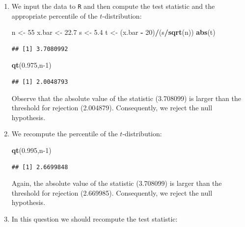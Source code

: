 \documentclass[]{krantz}
\makeatletter
\newenvironment{Shaded}{\begin{snugshade}}{\end{snugshade}}
\newcommand{\DecValTok}[1]{\textcolor[rgb]{0.00,0.00,0.81}{#1}}
\newcommand{\FloatTok}[1]{\textcolor[rgb]{0.00,0.00,0.81}{#1}}
\newcommand{\KeywordTok}[1]{\textcolor[rgb]{0.13,0.29,0.53}{\textbf{#1}}}
\newcommand{\NormalTok}[1]{#1}
\newcommand{\OperatorTok}[1]{\textcolor[rgb]{0.81,0.36,0.00}{\textbf{#1}}}
\newcommand{\StringTok}[1]{\textcolor[rgb]{0.31,0.60,0.02}{#1}}
\newenvironment{kframe}{%
\medskip{}
\setlength{\fboxsep}{.8em}
 \def\at@end@of@kframe{}%
 \ifinner\ifhmode%
  \def\at@end@of@kframe{\end{minipage}}%
  \begin{minipage}{\columnwidth}%
 \fi\fi%
 \def\FrameCommand##1{\hskip\@totalleftmargin \hskip-\fboxsep
 \colorbox{shadecolor}{##1}\hskip-\fboxsep
     \hskip-\linewidth \hskip-\@totalleftmargin \hskip\columnwidth}%
 \MakeFramed {\advance\hsize-\width
   \@totalleftmargin\z@ \linewidth\hsize
   \@setminipage}}%
 {\par\unskip\endMakeFramed%
 \at@end@of@kframe}
\renewenvironment{Shaded}{\begin{kframe}}{\end{kframe}}
\theoremstyle{definition}
\theoremstyle{definition}
\theoremstyle{definition}
\theoremstyle{remark}
\makeatother
\begin{document}
\begin{enumerate}
\def\labelenumi{\arabic{enumi}.}
\item
  We input the data to \texttt{R} and then
  compute the test statistic and the appropriate percentile of the
  \(t\)-distribution:

\begin{Shaded}
\begin{Highlighting}[]
\NormalTok{n <-}\StringTok{ }\DecValTok{55}
\NormalTok{x.bar <-}\StringTok{ }\FloatTok{22.7}
\NormalTok{s <-}\StringTok{ }\FloatTok{5.4}
\NormalTok{t <-}\StringTok{ }\NormalTok{(x.bar }\OperatorTok{-}\StringTok{ }\DecValTok{20}\NormalTok{)}\OperatorTok{/}\NormalTok{(s}\OperatorTok{/}\KeywordTok{sqrt}\NormalTok{(n))}
\KeywordTok{abs}\NormalTok{(t)}
\end{Highlighting}
\end{Shaded}

\begin{verbatim}
## [1] 3.7080992
\end{verbatim}

\begin{Shaded}
\begin{Highlighting}[]
\KeywordTok{qt}\NormalTok{(}\FloatTok{0.975}\NormalTok{,n}\DecValTok{-1}\NormalTok{)}
\end{Highlighting}
\end{Shaded}

\begin{verbatim}
## [1] 2.0048793
\end{verbatim}

  Observe that the absolute value of the statistic (3.708099) is larger
  than the threshold for rejection (2.004879). Consequently, we reject the
  null hypothesis.
\item
  We recompute the percentile of the \(t\)-distribution:

\begin{Shaded}
\begin{Highlighting}[]
\KeywordTok{qt}\NormalTok{(}\FloatTok{0.995}\NormalTok{,n}\DecValTok{-1}\NormalTok{)}
\end{Highlighting}
\end{Shaded}

\begin{verbatim}
## [1] 2.6699848
\end{verbatim}

  Again, the absolute value of the statistic (3.708099) is larger than the
  threshold for rejection (2.669985). Consequently, we reject the null
  hypothesis.
\item
  In this question we should recompute the test statistic:


\end{enumerate}
\end{document}
